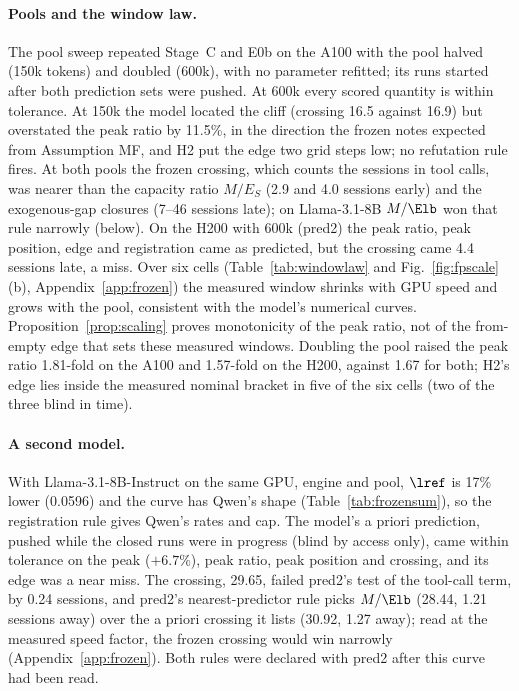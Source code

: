 \paragraph{Pools and the window law.} The pool sweep repeated Stage~C and E0b on the A100 with the pool halved (150k tokens) and doubled (600k), with no parameter refitted; its runs started after both prediction sets were pushed. At 600k every scored quantity is within tolerance. At 150k the model located the cliff (crossing 16.5 against 16.9) but overstated the peak ratio by 11.5\%, in the direction the frozen notes expected from Assumption MF, and H2 put the edge two grid steps low; no refutation rule fires. At both pools the frozen crossing, which counts the sessions in tool calls, was nearer than the capacity ratio $M/E_S$ (2.9 and 4.0 sessions early) and the exogenous-gap closures (7--46 sessions late); on Llama-3.1-8B $M/\Elb$ won that rule narrowly (below). On the H200 with 600k (pred2) the peak ratio, peak position, edge and registration came as predicted, but the crossing came 4.4 sessions late, a miss. Over six cells (Table~\ref{tab:windowlaw} and Fig.~\ref{fig:fpscale}(b), Appendix~\ref{app:frozen}) the measured window shrinks with GPU speed and grows with the pool, consistent with the model's numerical curves. Proposition~\ref{prop:scaling} proves monotonicity of the peak ratio, not of the from-empty edge that sets these measured windows. Doubling the pool raised the peak ratio 1.81-fold on the A100 and 1.57-fold on the H200, against 1.67 for both; H2's edge lies inside the measured nominal bracket in five of the six cells (two of the three blind in time).

\paragraph{A second model.} With Llama-3.1-8B-Instruct on the same GPU, engine and pool, $\lref$ is 17\% lower (0.0596\sps) and the curve has Qwen's shape (Table~\ref{tab:frozensum}), so the registration rule gives Qwen's rates and cap. The model's a priori prediction, pushed while the closed runs were in progress (blind by access only), came within tolerance on the peak ($+6.7\%$), peak ratio, peak position and crossing, and its edge was a near miss. The crossing, 29.65, failed pred2's test of the tool-call term, by 0.24 sessions, and pred2's nearest-predictor rule picks $M/\Elb$ (28.44, 1.21 sessions away) over the a priori crossing it lists (30.92, 1.27 away); read at the measured speed factor, the frozen crossing would win narrowly (Appendix~\ref{app:frozen}). Both rules were declared with pred2 after this curve had been read.

